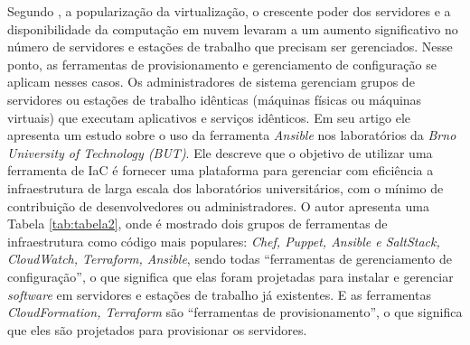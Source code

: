 Segundo , a popularização da virtualização, o crescente poder dos servidores e a disponibilidade da computação em nuvem levaram a um aumento significativo no número de servidores e estações de trabalho que precisam ser gerenciados. Nesse ponto, as ferramentas de provisionamento e gerenciamento de configuração se aplicam nesses casos. Os administradores de sistema gerenciam grupos de servidores ou estações de trabalho idênticas (máquinas físicas ou máquinas virtuais) que executam aplicativos e serviços idênticos. Em seu artigo ele apresenta um estudo sobre o uso da ferramenta \textit{Ansible} nos laboratórios da \textit{Brno University of Technology (BUT)}. Ele descreve que o objetivo de utilizar uma ferramenta de IaC é fornecer uma plataforma para gerenciar com eficiência a infraestrutura de larga escala dos laboratórios universitários, com o mínimo de contribuição de desenvolvedores ou administradores. O autor apresenta uma Tabela \ref{tab:tabela2}, onde é mostrado dois grupos de ferramentas de infraestrutura como código mais populares: \textit{Chef, Puppet, Ansible e SaltStack, CloudWatch, Terraform, Ansible}, sendo todas “ferramentas de gerenciamento de configuração”, o que significa que elas foram projetadas para instalar e gerenciar \textit{software} em servidores e estações de trabalho já existentes. E as ferramentas  \textit{CloudFormation, Terraform} são “ferramentas de provisionamento”, o que significa que eles são projetados para provisionar os servidores.


